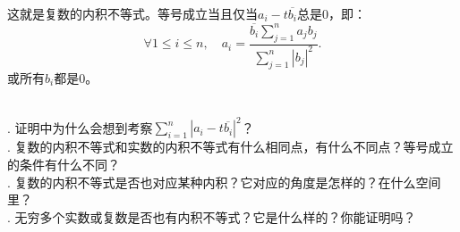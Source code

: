 \documentclass[12pt,UTF8,fontset=none]{ctexbook}
\begin{document}
\begin{appendix}
这就是复数的内积不等式。等号成立当且仅当$a_i - t\overline{b_i}$总是$0$，即：
$$ \forall 1\leqslant i \leqslant n, \quad a_i = \frac{\overline{b_i} \displaystyle \sum_{j=1}^n a_jb_j}{\displaystyle \sum_{j=1}^n |b_j|^2} . $$
或所有$b_i$都是$0$。

\begin{sk}
    \mbox{} \\
    . 证明中为什么会想到考察$\displaystyle \sum_{i=1}^n |a_i - t\overline{b_i}|^2$？\\
    . 复数的内积不等式和实数的内积不等式有什么相同点，有什么不同点？等号成立的条件有什么不同？\\
    . 复数的内积不等式是否也对应某种内积？它对应的角度是怎样的？在什么空间里？\\
    . 无穷多个实数或复数是否也有内积不等式？它是什么样的？你能证明吗？
\end{sk}

\end{appendix}
\end{document}
